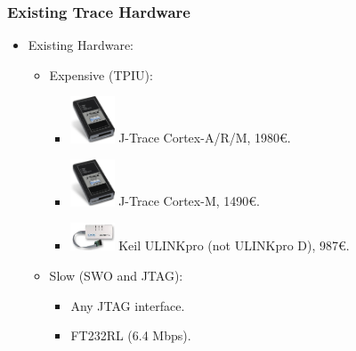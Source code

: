 \documentclass{beamer}
\begin{document}
\begin{frame}
    \frametitle{Existing Trace Hardware}
    \begin{itemize}
        \item Existing Hardware:
            \begin{itemize}
                \item Expensive (TPIU):
                    \begin{itemize}
                        \item \includegraphics[width=1.3cm,valign=c]{jtraceARM.png} J-Trace Cortex-A/R/M, 1980\euro.
                        \item \includegraphics[width=1.3cm,valign=c]{jtraceM.png} J-Trace Cortex-M, 1490\euro.
                        \item \includegraphics[width=1.3cm,valign=c]{ulink.jpeg} Keil ULINKpro (not ULINKpro D), 987\euro.
                    \end{itemize}
                \item Slow (SWO and JTAG):
                    \begin{itemize}
                        \item Any JTAG interface.
                        \item FT232RL (6.4 Mbps).
                    \end{itemize}
            \end{itemize}
    \end{itemize}
\end{frame}
\end{document}
